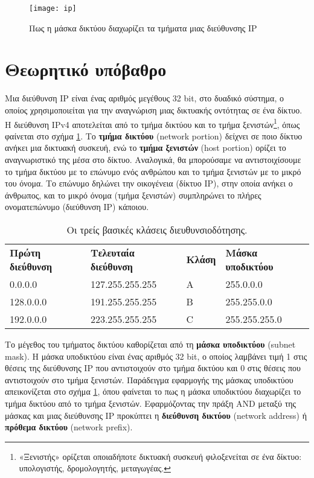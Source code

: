 \documentclass{EdipyLabs} %
\begin{document}
\begin{figure}
	\centering
	\texttt{[image: ip]}
	\caption{Πως η μάσκα δικτύου διαχωρίζει τα τμήματα μιας διεύθυνσης IP}\label{fig:ip}
\end{figure}

\section{Θεωρητικό υπόβαθρο}
Μια διεύθυνση IP είναι ένας αριθμός μεγέθους 32 bit, στο δυαδικό σύστημα, ο οποίος χρησιμοποιείται για την αναγνώριση μιας δικτυακής οντότητας σε ένα δίκτυο. Η διεύθυνση IPv4 αποτελείται από το τμήμα δικτύου και το τμήμα ξενιστών\footnote{«Ξενιστής» ορίζεται οποιαδήποτε δικτυακή συσκευή φιλοξενείται σε ένα δίκτυο: υπολογιστής, δρομολογητής, μεταγωγέας.}, όπως φαίνεται στο σχήμα \ref{fig:ip}. Το \textbf{τμήμα δικτύου} (network portion) δείχνει σε ποιο δίκτυο ανήκει μια δικτυακή συσκευή, ενώ το \textbf{τμήμα ξενιστών} (host portion) ορίζει το αναγνωριστικό της μέσα στο δίκτυο. Αναλογικά, θα μπορούσαμε να αντιστοιχίσουμε το τμήμα δικτύου με το επώνυμο ενός ανθρώπου και το τμήμα ξενιστών με το μικρό του όνομα. Το επώνυμο δηλώνει την οικογένεια (δίκτυο IP), στην οποία ανήκει ο άνθρωπος, και το μικρό όνομα (τμήμα ξενιστών) συμπληρώνει το πλήρες ονοματεπώνυμο (διεύθυνση IP) κάποιου.

\begin{table}[ht!]\centering\renewcommand{\arraystretch}{1.5}
	\begin{tabular}{llll}
		\FormatFirstRow
		\textbf{Πρώτη διεύθυνση} & \textbf{Τελευταία διεύθυνση} & \textbf{Κλάση} & \textbf{Μάσκα υποδικτύου} \\
		0.0.0.0			& 127.255.255.255	  & A	  & 255.0.0.0		  \\
		128.0.0.0		& 191.255.255.255	  & B	  & 255.255.0.0		  \\
		192.0.0.0		& 223.255.255.255	  & C	  & 255.255.255.0
	\end{tabular}
	\caption{Οι τρείς βασικές κλάσεις διευθυνσιοδότησης.}\label{tab:clasful}
\end{table}

Το μέγεθος του τμήματος δικτύου καθορίζεται από τη \textbf{μάσκα υποδικτύου} (subnet mask). Η μάσκα υποδικτύου είναι ένας αριθμός 32 bit, ο οποίος λαμβάνει τιμή 1 στις θέσεις της διεύθυνσης IP που αντιστοιχούν στο τμήμα δικτύου και 0 στις θέσεις που αντιστοιχούν στο τμήμα ξενιστών. Παράδειγμα εφαρμογής της μάσκας υποδικτύου απεικονίζεται στο σχήμα \ref{fig:ip}, όπου φαίνεται το πως η μάσκα υποδικτύου διαχωρίζει το τμήμα δικτύου από το τμήμα ξενιστών. Εφαρμόζοντας την πράξη AND μεταξύ της μάσκας και μιας διεύθυνσης IP προκύπτει η \textbf{διεύθυνση δικτύου} (network address) ή \textbf{πρόθεμα δικτύου} (network prefix).
\end{document}
